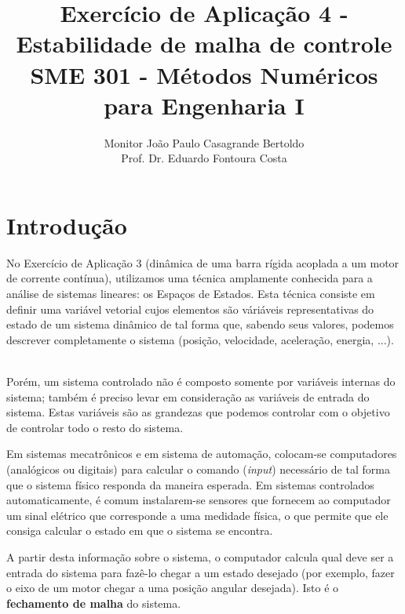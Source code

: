 \documentclass[12pt,a4paper,english,brazil]{article}
\begin{document}
\title{ Exercício de Aplicação 4 - Estabilidade de malha de controle \\ 
        SME 301 -  Métodos Numéricos para Engenharia I }
\date{\vspace{-5ex}}
\author{ Monitor João Paulo Casagrande Bertoldo \\
         Prof. Dr. Eduardo Fontoura Costa }
\maketitle
\vspace{15pt}

\section{Introdução}\label{sec-intro}

No Exercício de Aplicação 3 (dinâmica de uma barra rígida acoplada a um motor de corrente contínua), utilizamos uma técnica amplamente conhecida para a análise de sistemas lineares: os Espaços de Estados. Esta técnica consiste em definir uma variável vetorial cujos elementos são váriáveis representativas do estado de um sistema dinâmico de tal forma que, sabendo seus valores, podemos descrever completamente o sistema (posição, velocidade, aceleração, energia, ...).  \

Porém, um sistema controlado não é composto somente por variáveis internas do sistema; também é preciso levar em consideração as variáveis de entrada do sistema. Estas variáveis são as grandezas que podemos controlar com o objetivo de controlar todo o resto do sistema. \

Em sistemas mecatrônicos e em sistema de automação, colocam-se computadores (analógicos ou digitais) para calcular o comando (\textit{input}) necessário de tal forma que o sistema físico responda da maneira esperada. Em sistemas controlados automaticamente, é comum instalarem-se sensores que fornecem ao computador um sinal elétrico que corresponde a uma medidade física, o que permite que ele consiga calcular o estado em que o sistema se encontra. \

A partir desta informação sobre o sistema, o computador calcula qual deve ser a entrada do sistema para fazê-lo chegar a um estado desejado (por exemplo, fazer o eixo de um motor chegar a uma posição angular desejada). Isto é o \textbf{fechamento de malha} do sistema. \
\end{document}
